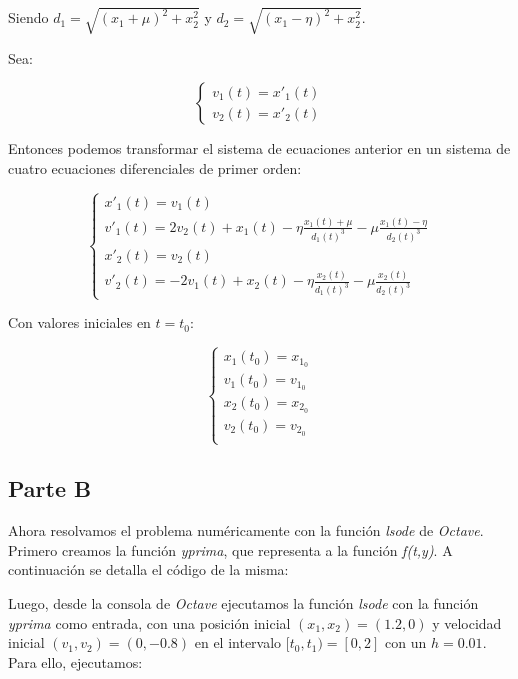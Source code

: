 \documentclass[titlepage,a4paper]{article}
\begin{document}
		Siendo $d_{1}=\sqrt{(x_{1}+\mu)^{2} + x_{2}^{2}}$ y $d_{2}=\sqrt{(x_{1}-\eta)^{2} + x_{2}^{2}}$.

		Sea:

		\begin{equation}
			\begin{cases}
				v_{1}(t) = x'_{1}(t)\\
				v_{2}(t) = x'_{2}(t)
			\end{cases}
		\end{equation}

		Entonces podemos transformar el sistema de ecuaciones anterior en un sistema de cuatro ecuaciones 
		diferenciales de primer orden:

		\begin{equation}
			\begin{cases}
				x'_{1}(t) = v_{1}(t)\\
				v'_{1}(t) = 2v_{2}(t) + x_{1}(t) - \eta\frac{x_{1}(t) + \mu}{d_{1}(t)^{3}} - \mu\frac{x_{1}(t) - \eta}{d_{2}(t)^{3}}\\
				x'_{2}(t) = v_{2}(t)\\				
				v'_{2}(t) = -2v_{1}(t) + x_{2}(t) - \eta\frac{x_{2}(t)}{d_{1}(t)^{3}} - \mu\frac{x_{2}(t)}{d_{2}(t)^{3}}
			\end{cases}
		\end{equation}

		Con valores iniciales en $t=t_{0}$:

		\begin{equation}
			\begin{cases}
				x_{1}(t_{0}) = x_{1_{0}}\\
				v_{1}(t_{0}) = v_{1_{0}}\\
				x_{2}(t_{0}) = x_{2_{0}}\\				
				v_{2}(t_{0}) = v_{2_{0}}\\
			\end{cases}
		\end{equation}

	\subsection{Parte B}\label{sec:parteB}
		Ahora resolvamos el problema numéricamente con la función \emph{lsode} de \emph{Octave}.		
		Primero creamos la función \emph{yprima}, que representa a la función \emph{f(t,y)}.
		A continuación se detalla el código de la misma:

		

		Luego, desde la consola de \emph{Octave} ejecutamos la función \emph{lsode} con la función 
		\emph{yprima} como entrada, con una posición inicial $(x_{1}, x_{2}) = (1.2, 0)$ y velocidad inicial 
		$(v_{1}, v_{2}) = (0, -0.8)$ en el intervalo $[t_{0}, t_{1}) = [0, 2]$ con un $h=0.01$.
		Para ello, ejecutamos:
\end{document}
